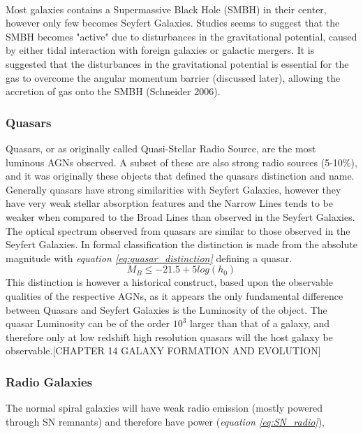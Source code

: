 \documentclass[a4paper, 12pt, twoside]{article}
\begin{document}
\\
Most galaxies contains a Supermassive Black Hole (SMBH) in their center, however only few becomes Seyfert Galaxies. Studies seems to suggest that the SMBH becomes "active" due to disturbances in the gravitational potential, caused by either tidal interaction with foreign galaxies or galactic mergers. It is suggested that the disturbances in the gravitational potential is essential for the gas to overcome the angular momentum barrier (discussed later), allowing the accretion of gas onto the SMBH (Schneider 2006).

\subsubsection{Quasars}
Quasars, or as originally called Quasi-Stellar Radio Source, are the most luminous AGNs observed. A subset of these are also strong radio sources (5-10\%), and it was originally these objects that defined the quasars distinction and name. Generally quasars have strong similarities with Seyfert Galaxies, however they have very weak stellar absorption features and the Narrow Lines tends to be weaker when compared to the Broad Lines than observed in the Seyfert Galaxies. The optical spectrum observed from quasars are similar to those observed in the Seyfert Galaxies. In formal classification the distinction is made from the absolute magnitude with \emph{equation \ref{eq:quasar_distinction}} defining a quasar.
\begin{equation}
M_{B} \le -21.5 + 5log(h_{0}) 
\label{eq:quasar_distinction}
\end{equation}
This distinction is however a historical construct, based upon the observable qualities of the respective AGNs, as it appears the only fundamental difference between Quasars and Seyfert Galaxies is the Luminosity of the object. The quasar Luminosity can be of the order $10^3$ larger than that of a galaxy, and therefore only at low redshift high resolution quasars will the host galaxy be observable.[CHAPTER 14 GALAXY FORMATION AND EVOLUTION]

\subsubsection{Radio Galaxies}
The normal spiral galaxies will have weak radio emission (mostly powered through SN remnants) and therefore have power (\emph{equation \ref{eq:SN_radio}}),
\end{document}
